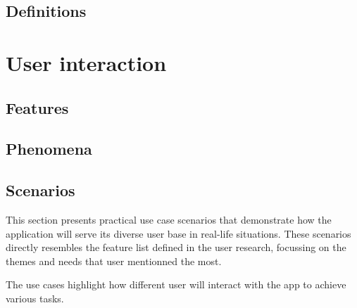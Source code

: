 \documentclass{article}
\begin{document}
\subsection{Definitions}


\section{User interaction}

\subsection{Features}


\subsection{Phenomena}


\subsection{Scenarios}

This section presents practical use case scenarios that demonstrate how the application will serve its diverse user base in real-life situations.
These scenarios directly resembles the feature list defined in the user research, focussing on the themes and needs that user mentionned the most.

The use cases highlight how different user will interact with the app to achieve various tasks.
\end{document}

